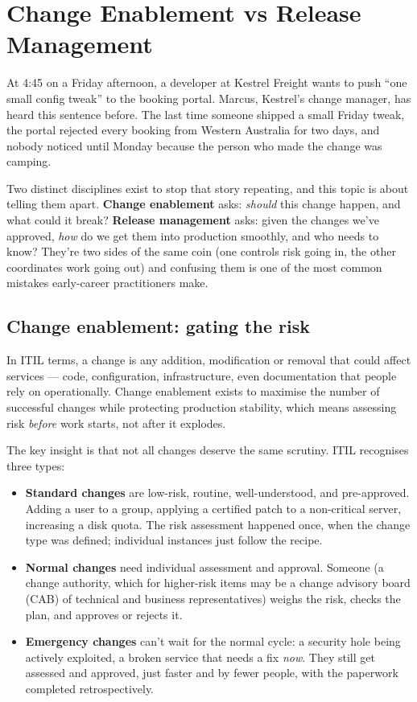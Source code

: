 \section{Change Enablement vs Release Management}
At 4:45 on a Friday afternoon, a developer at Kestrel Freight wants to push ``one small config tweak'' to the booking portal. Marcus, Kestrel's change manager, has heard this sentence before. The last time someone shipped a small Friday tweak, the portal rejected every booking from Western Australia for two days, and nobody noticed until Monday because the person who made the change was camping.


Two distinct disciplines exist to stop that story repeating, and this topic is about telling them apart. \textbf{Change enablement} asks: \emph{should} this change happen, and what could it break? \textbf{Release management} asks: given the changes we've approved, \emph{how} do we get them into production smoothly, and who needs to know? They're two sides of the same coin (one controls risk going in, the other coordinates work going out) and confusing them is one of the most common mistakes early-career practitioners make.



\subsection{Change enablement: gating the risk}


In ITIL terms, a change is any addition, modification or removal that could affect services — code, configuration, infrastructure, even documentation that people rely on operationally. Change enablement exists to maximise the number of successful changes while protecting production stability, which means assessing risk \emph{before} work starts, not after it explodes.


The key insight is that not all changes deserve the same scrutiny. ITIL recognises three types:


\begin{itemize}[leftmargin=*]
\item \textbf{Standard changes} are low-risk, routine, well-understood, and pre-approved. Adding a user to a group, applying a certified patch to a non-critical server, increasing a disk quota. The risk assessment happened once, when the change type was defined; individual instances just follow the recipe.
\item \textbf{Normal changes} need individual assessment and approval. Someone (a change authority, which for higher-risk items may be a change advisory board (CAB) of technical and business representatives) weighs the risk, checks the plan, and approves or rejects it.
\item \textbf{Emergency changes} can't wait for the normal cycle: a security hole being actively exploited, a broken service that needs a fix \emph{now}. They still get assessed and approved, just faster and by fewer people, with the paperwork completed retrospectively.
\end{itemize}


